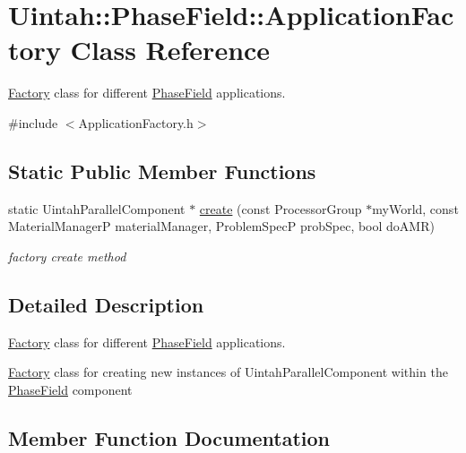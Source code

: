 \hypertarget{classUintah_1_1PhaseField_1_1ApplicationFactory}{}\section{Uintah\+:\+:Phase\+Field\+:\+:Application\+Factory Class Reference}
\label{classUintah_1_1PhaseField_1_1ApplicationFactory}


\hyperlink{classUintah_1_1PhaseField_1_1Factory}{Factory} class for different \hyperlink{namespaceUintah_1_1PhaseField}{Phase\+Field} applications.  




{\ttfamily \#include $<$Application\+Factory.\+h$>$}

\subsection*{Static Public Member Functions}
\begin{DoxyCompactItemize}
\item 
static Uintah\+Parallel\+Component $\ast$ \hyperlink{classUintah_1_1PhaseField_1_1ApplicationFactory_ac5cb141180ec988bac718994efcce36f}{create} (const Processor\+Group $\ast$my\+World, const Material\+ManagerP material\+Manager, Problem\+SpecP prob\+Spec, bool do\+A\+MR)
\begin{DoxyCompactList}\small\item\em factory create method \end{DoxyCompactList}\end{DoxyCompactItemize}


\subsection{Detailed Description}
\hyperlink{classUintah_1_1PhaseField_1_1Factory}{Factory} class for different \hyperlink{namespaceUintah_1_1PhaseField}{Phase\+Field} applications. 

\hyperlink{classUintah_1_1PhaseField_1_1Factory}{Factory} class for creating new instances of Uintah\+Parallel\+Component within the \hyperlink{namespaceUintah_1_1PhaseField}{Phase\+Field} component 

\subsection{Member Function Documentation}
\mbox{\label{classUintah_1_1PhaseField_1_1ApplicationFactory_ac5cb141180ec988bac718994efcce36f}} 

